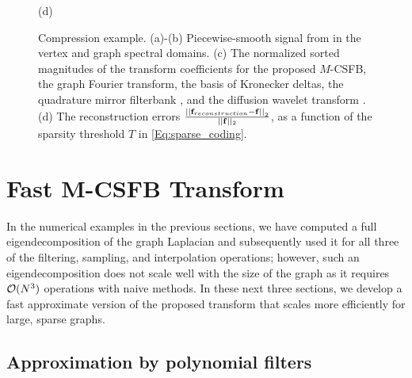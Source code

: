 \documentclass[journal, 10pt]{IEEEtran}
\begin{document}
\begin{figure}[tbh]
\begin{minipage}[m]{0.48\linewidth}
\centerline{\small{(d)}}
\end{minipage}
\caption{Compression example. (a)-(b) Piecewise-smooth signal from \cite[Fig. 11]{shuman_TSP_multiscale} in the vertex and graph spectral domains. (c) The normalized sorted magnitudes of the transform coefficients for the proposed $M$-CSFB, %
the graph Fourier transform, the basis of Kronecker deltas, the quadrature mirror filterbank \cite{narang2012perfect}, and the diffusion wavelet transform \cite{coifman2006diffusion}. (d) The reconstruction errors  $\frac{\left|\left|{\bf f}_{\mbox{reconstruction}}-{\bf f}\right|\right|_2}{||{\bf f}||_2}$, as a function of the sparsity threshold $T$ in \eqref{Eq:sparse_coding}.} \label{Fig:comp}
\end{figure}

\section{Fast M-CSFB Transform} \label{Se:fast_mcsfb}
In the numerical examples in the previous sections, we have computed a full eigendecomposition of the graph Laplacian and subsequently used it for all three of the filtering, sampling, and interpolation operations; however, such an eigendecomposition does not scale well with the size of the graph as it requires ${\cal O}(N^3)$ operations with naive methods. In these next three sections, we develop a fast approximate version of the proposed transform that scales more efficiently for large, sparse graphs. 

\subsection{Approximation by polynomial filters} \label{Se:poly_approx}
\end{document}
